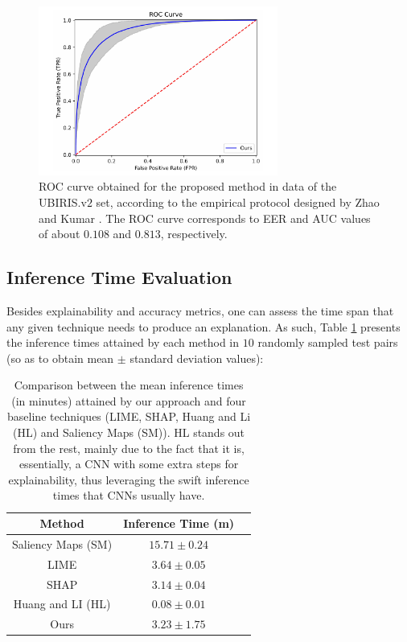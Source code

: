 \begin{figure}[h]
  \begin{center}
  \includegraphics[width=0.7\textwidth]{figures/figure_39.pdf}
  \caption{\ac{ROC} curve obtained for the proposed method in data of the UBIRIS.v$2$ set, according to the empirical protocol designed by Zhao and Kumar \cite{accurate_periocular_recognition}. The \ac{ROC} curve corresponds to \ac{EER} and \ac{AUC} values of about $0.108$ and $0.813$, respectively.}
  \label{fig:roc_curve}
  \end{center}
\end{figure}

\subsection{Inference Time Evaluation}
\label{subsec:chap4_inference_time_evaluation}

Besides explainability and accuracy metrics, one can assess the time span that any given technique needs to produce an explanation. As such, Table \ref{tab:inference_times_evaluation} presents the inference times attained by each method in $10$ randomly sampled test pairs (so as to obtain mean $\pm$ standard deviation values):

\begin{table}[!h]
\small
{\renewcommand{\arraystretch}{1.5}%
\begin{center}
 \begin{tabular}{|c | c | c|} 
 \hline
 \textbf{Method} & \textbf{Inference Time (m)}\\
 \hline
 \hline
 Saliency Maps (SM) \cite{saliency_maps} & $15.71 \pm 0.24$ \\
 \ac{LIME} \cite{lime} & $3.64 \pm 0.05$ \\
 \ac{SHAP} \cite{shap} & $3.14 \pm 0.04$ \\
 Huang and LI (HL) \cite{interpretability_by_parts} & $\mathbf{0.08 \pm 0.01}$ \\
 Ours & $3.23 \pm 1.75$ \\
 \hline
\end{tabular}
\end{center}}
\caption{Comparison between the mean inference times (in minutes) attained by our approach and four baseline techniques (\ac{LIME}, \ac{SHAP}, Huang and Li (HL) and Saliency Maps (SM)). HL stands out from the rest, mainly due to the fact that it is, essentially, a \ac{CNN} with some extra steps for explainability, thus leveraging the swift inference times that \ac{CNN}s usually have.}
\label{tab:inference_times_evaluation}
\end{table}


